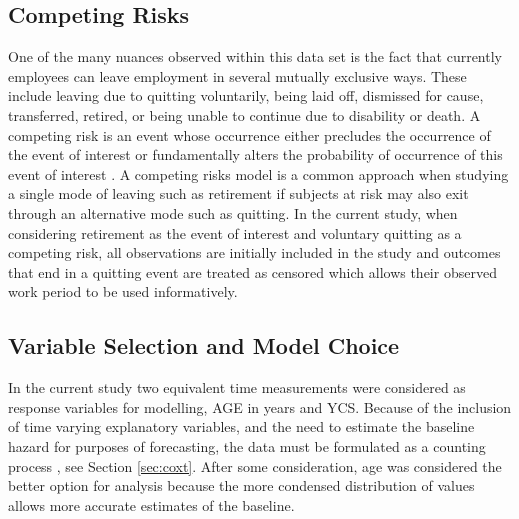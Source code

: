 
\subsection{Competing Risks}
One of the many nuances observed within this data set is the fact that currently employees can leave employment in several mutually exclusive ways. These include leaving due to quitting voluntarily, being laid off, dismissed for cause, transferred, retired, or being unable to continue due to disability or death. A competing risk is an event whose occurrence either precludes the occurrence of the event of interest or fundamentally alters the probability of occurrence of this event of interest \citep{tableman2003}.  A competing risks model is a common approach when studying a single mode of leaving such as retirement if subjects at risk may also exit through an alternative mode such as quitting. In the current study, when considering retirement as the event of interest and voluntary quitting as a competing risk, all observations are initially included in the study and outcomes that end in a quitting event are treated as censored which allows their observed work period to be used informatively.


\subsection{Variable Selection and Model Choice} \label{sec:modelchoice}
In the current study two equivalent time measurements were considered as response variables for modelling, AGE in years and YCS.  Because of the inclusion of time varying explanatory variables, and the need to estimate the baseline hazard for purposes of forecasting, the data must be formulated as a counting process , see Section \ref{sec:coxt}. After some consideration, age was considered the better option for analysis because the more condensed distribution of values allows more accurate estimates of the baseline.

